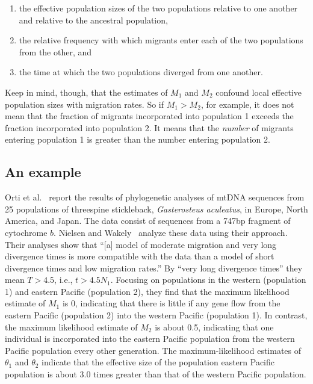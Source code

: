 \documentclass[12pt]{article}
\begin{document}
\begin{enumerate}

\item the effective population sizes of the two populations relative
  to one another and relative to the ancestral population, 

\item the relative frequency with which migrants enter each of the two
  populations from the other, and 

\item the time at which the two populations diverged from one another.

\end{enumerate}

\noindent Keep in mind, though, that the estimates of $M_1$ and $M_2$
confound local effective population sizes with migration rates. So if
$M_1 > M_2$, for example, it does not mean that the fraction of
migrants incorporated into population 1 exceeds the fraction
incorporated into population 2. It means that the {\it number\/} of
migrants entering population 1 is greater than the number entering
population 2.

\subsection*{An example}

Orti et al.~\cite{Orti-etal-1994} report the results of phylogenetic
analyses of mtDNA sequences from 25 populations of threespine
stickleback, {\it Gasterosteus aculeatus}, in Europe, North America,
and Japan. The data consist of sequences from a 747bp fragment of
cytochrome $b$. Nielsen and Wakely~\cite{Nielsen-Wakeley-2001} analyze
these data using their approach. Their analyses show that ``[a] model
of moderate migration and very long divergence times is more
compatible with the data than a model of short divergence times and
low migration rates.'' By ``very long divergence times'' they mean $T
> 4.5$, i.e., $t > 4.5N_1$. Focusing on populations in the western
(population 1) and eastern Pacific (population 2), they find that the
maximum likelihood estimate of $M_1$ is 0, indicating that there is
little if any gene flow from the eastern Pacific (population 2) into
the western Pacific (population 1). In contrast, the maximum
likelihood estimate of $M_2$ is about 0.5, indicating that one
individual is incorporated into the eastern Pacific population from
the western Pacific population every other generation. The
maximum-likelihood estimates of $\theta_1$ and $\theta_2$ indicate
that the effective size of the population eastern Pacific population
is about 3.0 times greater than that of the western Pacific
population.
\end{document}
